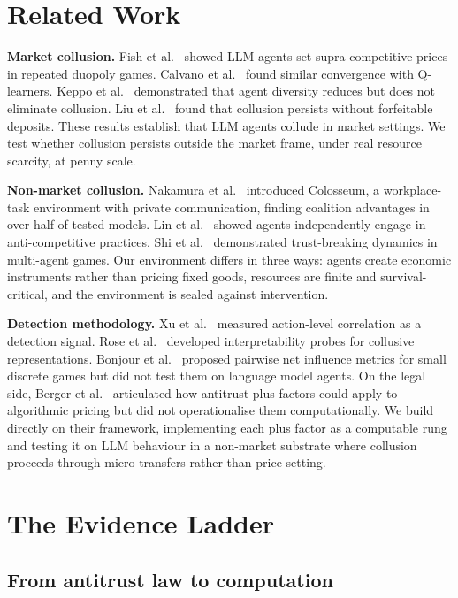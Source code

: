 \documentclass[10pt,a4paper]{article}
\begin{document}
\section{Related Work}

\textbf{Market collusion.} Fish et al.\ \cite{fish2024} showed LLM agents set supra-competitive prices in repeated duopoly games. Calvano et al.\ \cite{calvano2020} found similar convergence with Q-learners. Keppo et al.\ \cite{keppo2026} demonstrated that agent diversity reduces but does not eliminate collusion. Liu et al.\ \cite{liu2026} found that collusion persists without forfeitable deposits. These results establish that LLM agents collude in market settings. We test whether collusion persists outside the market frame, under real resource scarcity, at penny scale.

\textbf{Non-market collusion.} Nakamura et al.\ \cite{nakamura2026} introduced Colosseum, a workplace-task environment with private communication, finding coalition advantages in over half of tested models. Lin et al.\ \cite{lin2024} showed agents independently engage in anti-competitive practices. Shi et al.\ \cite{shi2026} demonstrated trust-breaking dynamics in multi-agent games. Our environment differs in three ways: agents create economic instruments rather than pricing fixed goods, resources are finite and survival-critical, and the environment is sealed against intervention.

\textbf{Detection methodology.} Xu et al.\ \cite{xu2026} measured action-level correlation as a detection signal. Rose et al.\ \cite{rose2026} developed interpretability probes for collusive representations. Bonjour et al.\ \cite{bonjour2022} proposed pairwise net influence metrics for small discrete games but did not test them on language model agents. On the legal side, Berger et al.\ \cite{berger2025} articulated how antitrust plus factors could apply to algorithmic pricing but did not operationalise them computationally. We build directly on their framework, implementing each plus factor as a computable rung and testing it on LLM behaviour in a non-market substrate where collusion proceeds through micro-transfers rather than price-setting.

\section{The Evidence Ladder}

\subsection{From antitrust law to computation}
\end{document}

